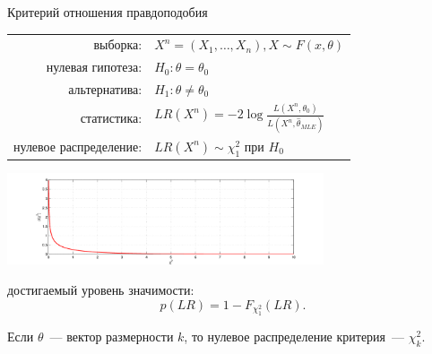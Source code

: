 \documentclass[9pt,pdf,utf8,hyperref={unicode},aspectratio=169]{beamer}
\begin{document}
\begin{frame}{Критерий отношения правдоподобия}
	\begin{center}
		\begin{tabular}{rl}
			выборка:                        & $X^n=\left(X_1,\ldots,X_n\right), X\sim F\left(x, \theta\right)$\\
			нулевая гипотеза:               & $H_0\colon \theta=\theta_0$ \\
			альтернатива:                   & $H_1\colon \theta\neq\theta_0$ \\
			статистика:                     & $LR\left(X^n\right) = -2\log \frac{L\left(X^n, \theta_0\right)}{L\left(X^n, \hat{\theta}_{MLE}\right)}$ \\
			нулевое распределение:          & $LR\left(X^n\right) \sim \chi^2_1$ при $H_0$\\
		\end{tabular}
		\includegraphics[width=0.7\textwidth]{chi21.png}
	\end{center}
	достигаемый уровень значимости: 
	$$p\left(LR\right) = 1 - F_{\chi^2_1}\left(LR\right).$$
	
	Если $\theta$~--- вектор размерности $k$, то нулевое распределение критерия~--- $\chi^2_k.$
\end{frame}
\end{document}
